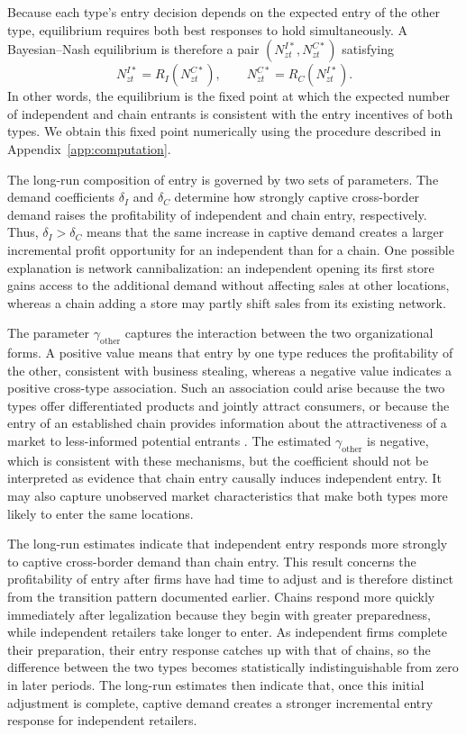 \documentclass[english,12pt]{article}
\begin{document}
Because each type's entry decision depends on the expected entry of the other type, equilibrium requires both best responses to hold simultaneously. A Bayesian--Nash equilibrium is therefore a pair $(N^{I*}_{zt},N^{C*}_{zt})$ satisfying
\begin{equation}
\label{eq:bne}
N^{I*}_{zt}=R_I(N^{C*}_{zt}),
\qquad
N^{C*}_{zt}=R_C(N^{I*}_{zt}).
\end{equation}
In other words, the equilibrium is the fixed point at which the expected number of independent and chain entrants is consistent with the entry incentives of both types. We obtain this fixed point numerically using the procedure described in Appendix~\ref{app:computation}.

The long-run composition of entry is governed by two sets of parameters. The demand coefficients $\delta_I$ and $\delta_C$ determine how strongly captive cross-border demand raises the profitability of independent and chain entry, respectively. Thus, $\delta_I>\delta_C$ means that the same increase in captive demand creates a larger incremental profit opportunity for an independent than for a chain. One possible explanation is network cannibalization: an independent opening its first store gains access to the additional demand without affecting sales at other locations, whereas a chain adding a store may partly shift sales from its existing network.

The parameter $\gamma_{\text{other}}$ captures the interaction between the two organizational forms. A positive value means that entry by one type reduces the profitability of the other, consistent with business stealing, whereas a negative value indicates a positive cross-type association. Such an association could arise because the two types offer differentiated products and jointly attract consumers, or because the entry of an established chain provides information about the attractiveness of a market to less-informed potential entrants \citep{CaplinLeahy1998,ToivanenWaterson2005}. The estimated $\gamma_{\text{other}}$ is negative, which is consistent with these mechanisms, but the coefficient should not be interpreted as evidence that chain entry causally induces independent entry. It may also capture unobserved market characteristics that make both types more likely to enter the same locations.

The long-run estimates indicate that independent entry responds more strongly to captive cross-border demand than chain entry. This result concerns the profitability of entry after firms have had time to adjust and is therefore distinct from the transition pattern documented earlier. Chains respond more quickly immediately after legalization because they begin with greater preparedness, while independent retailers take longer to enter. As independent firms complete their preparation, their entry response catches up with that of chains, so the difference between the two types becomes statistically indistinguishable from zero in later periods. The long-run estimates then indicate that, once this initial adjustment is complete, captive demand creates a stronger incremental entry response for independent retailers.
\end{document}
